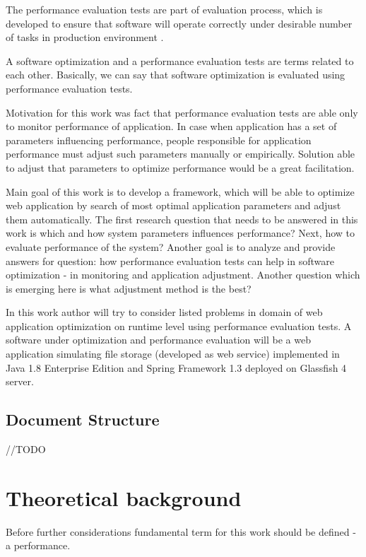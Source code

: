 \documentclass[10pt,a4paper]{article}
\begin{document}
The performance evaluation tests are part of evaluation process, which is developed to ensure that software will operate correctly under desirable number of tasks in production environment \cite{analysisofpet}.   

A software optimization and a performance evaluation tests are terms related to each other. Basically, we can say that software optimization is evaluated using performance evaluation tests. 

Motivation for this work was fact that performance evaluation tests are able only to monitor performance of application. In case when application has a set of parameters influencing performance, people responsible for application performance must adjust such parameters manually or empirically. Solution able to adjust that parameters to optimize performance would be a great facilitation. 

Main goal of this work is to develop a framework, which will be able to optimize web application by search of most optimal application parameters and adjust them automatically. The first research question that needs to be answered in this work is which and how system parameters influences performance? Next, how to evaluate performance of the system? Another goal is to analyze and provide answers for question: how performance evaluation tests can help in software optimization - in monitoring and application adjustment. Another question which is emerging here is what adjustment method is the best? 

In this work author will try to consider listed problems in domain of web application optimization on runtime level using performance evaluation tests. A software under optimization and performance evaluation will be a web application simulating file storage (developed as web service) implemented in Java 1.8 Enterprise Edition and Spring Framework 1.3 deployed on Glassfish 4 server. 

\subsection{Document Structure}

//TODO


\section{Theoretical background}
Before further considerations fundamental term for this work should be defined  - a performance. 
\end{document}
